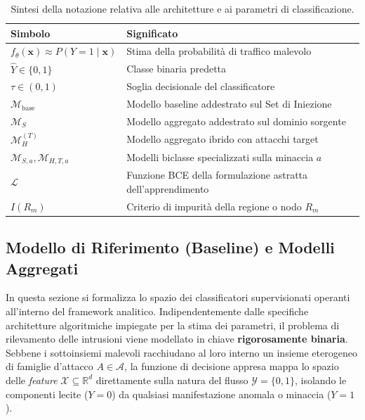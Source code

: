 \begin{table}[H]
    \centering
    \small
    \caption{Sintesi della notazione relativa alle architetture e ai parametri di classificazione.}
    \label{tab:notazione_modelli}
    \begin{tabularx}{\textwidth}{
        l
        >{\raggedright\arraybackslash}X
    }
        \toprule
        \textbf{Simbolo} & \textbf{Significato} \\
        \midrule

        $f_\theta(\mathbf{x}) \approx P(Y=1 \mid \mathbf{x})$ &
        Stima della probabilità di traffico malevolo \\

        $\hat{Y} \in \{0,1\}$ &
        Classe binaria predetta \\

        $\tau \in (0,1)$ &
        Soglia decisionale del classificatore \\

        $\mathcal{M}_{\text{base}}$ &
        Modello baseline addestrato sul Set di Iniezione \\

        $\mathcal{M}_{S}$ &
        Modello aggregato addestrato sul dominio sorgente \\

        $\mathcal{M}_{H}^{(T)}$ &
        Modello aggregato ibrido con attacchi target \\

        $\mathcal{M}_{S,a}, \mathcal{M}_{H,T,a}$ &
        Modelli biclasse specializzati sulla minaccia $a$ \\

        $\mathcal{L}$ &
        Funzione BCE della formulazione astratta dell'apprendimento \\

        $I(R_m)$ &
        Criterio di impurità della regione o nodo $R_m$ \\

        \bottomrule
    \end{tabularx}
\end{table}

\subsection{Modello di Riferimento (Baseline) e Modelli Aggregati}
\label{subsec:modelli_aggregati}

In questa sezione si formalizza lo spazio dei classificatori supervisionati operanti all'interno del framework analitico. Indipendentemente dalle specifiche architetture algoritmiche impiegate per la stima dei parametri, il problema di rilevamento delle intrusioni viene modellato in chiave \textbf{rigorosamente binaria}. Sebbene i sottoinsiemi malevoli racchiudano al loro interno un insieme eterogeneo di famiglie d'attacco $A \in \mathcal{A}$, la funzione di decisione appresa mappa lo spazio delle \textit{feature} $\mathcal{X} \subseteq \mathbb{R}^d$ direttamente sulla natura del flusso $\mathcal{Y} = \{0, 1\}$, isolando le componenti lecite ($Y = 0$) da qualsiasi manifestazione anomala o minaccia ($Y = 1$).


